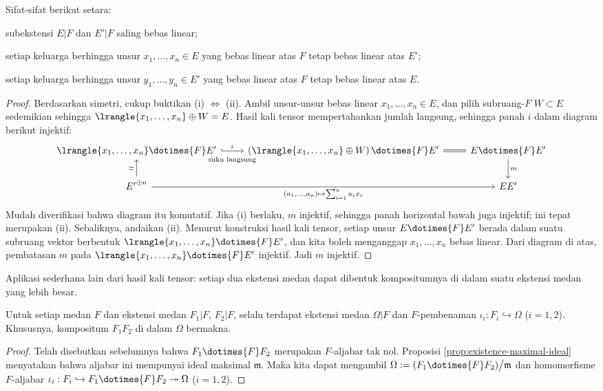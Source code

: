 \begin{proposition}
	Sifat-sifat berikut setara:
	\begin{compactenum}[(i)]
		\item subekstensi $E|F$ dan $E'|F$ saling bebas linear;
		\item setiap keluarga berhingga unsur $x_1, \ldots, x_n \in E$ yang bebas linear atas $F$ tetap bebas linear atas $E'$;
		\item setiap keluarga berhingga unsur $y_1, \ldots, y_n \in E'$ yang bebas linear atas $F$ tetap bebas linear atas $E$.
	\end{compactenum}
\end{proposition}
\begin{proof}
	Berdasarkan simetri, cukup buktikan (i) $\iff$ (ii). Ambil unsur-unsur bebas linear $x_1, \ldots, x_n \in E$, dan pilih subruang-$F$ $W \subset E$ sedemikian sehingga $\lrangle{x_1, \ldots, x_n} \oplus W = E$. Hasil kali tensor mempertahankan jumlah langsung, sehingga panah $i$ dalam diagram berikut injektif:
	\[\begin{tikzcd}
		\lrangle{x_1, \ldots, x_n} \dotimes{F} E' \arrow[hookrightarrow, r, "i", "\text{suku langsung}"' inner sep=0.6em] & \left( \lrangle{x_1, \ldots, x_n} \oplus W \right) \dotimes{F} E' \arrow[equal, r] & E \dotimes{F} E' \arrow[d, "m"] \\
		{E'}^{\oplus n} \arrow[u, "\simeq"] \arrow[rr, "{(a_1, \ldots, a_n) \mapsto \sum_{i=1}^n a_i x_i}"'] & & EE'
	\end{tikzcd}\]
	Mudah diverifikasi bahwa diagram itu komutatif. Jika (i) berlaku, $m$ injektif, sehingga panah horizontal bawah juga injektif; ini tepat merupakan (ii). Sebaliknya, andaikan (ii). Menurut konstruksi hasil kali tensor, setiap unsur $E \dotimes{F} E'$ berada dalam suatu subruang vektor berbentuk $\lrangle{x_1, \ldots, x_n} \dotimes{F} E'$, dan kita boleh menganggap $x_1, \ldots, x_n$ bebas linear. Dari diagram di atas, pembatasan $m$ pada $\lrangle{x_1, \ldots, x_n} \dotimes{F} E'$ injektif. Jadi $m$ injektif.
\end{proof}

Aplikasi sederhana lain dari hasil kali tensor: setiap dua ekstensi medan dapat dibentuk kompositumnya di dalam suatu ekstensi medan yang lebih besar.
\begin{proposition}
	Untuk setiap medan $F$ dan ekstensi medan $F_1|F$, $F_2|F$, selalu terdapat ekstensi medan $\Omega|F$ dan $F$-pembenaman $\iota_i: F_i \hookrightarrow  \Omega$ ($i=1,2$). Khususnya, kompositum $F_1 F_2$ di dalam $\Omega$ bermakna.
\end{proposition}
\begin{proof}
	Telah disebutkan sebelumnya bahwa $F_1 \dotimes{F} F_2$ merupakan $F$-aljabar tak nol. Proposisi \ref{prop:existence-maximal-ideal} menyatakan bahwa aljabar ini mempunyai ideal maksimal $\mathfrak{m}$. Maka kita dapat mengambil $\Omega := (F_1 \dotimes{F} F_2) \big/ \mathfrak{m}$ dan homomorfisme $F$-aljabar $\iota_i: F_i \hookrightarrow F_1 \dotimes{F} F_2 \twoheadrightarrow \Omega$ ($i=1,2$).
\end{proof}

